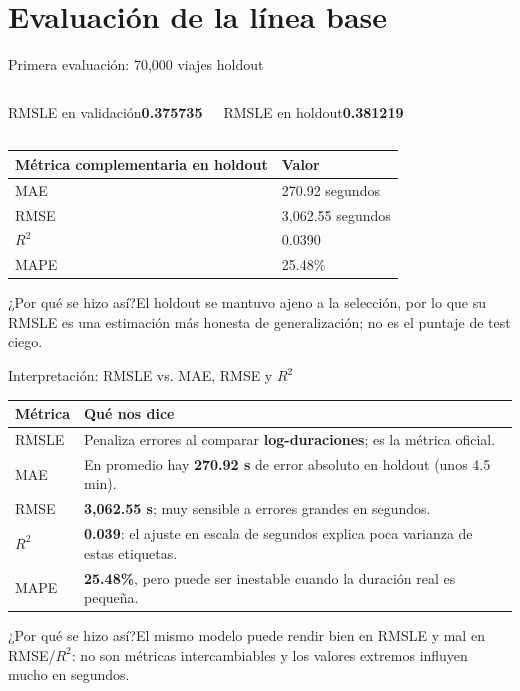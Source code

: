 \documentclass[aspectratio=169,11pt]{beamer}
\newcommand{\porq}[1]{\vspace{1.2mm}\begin{block}{¿Por qué se hizo así?}\small #1\end{block}}
\newcommand{\dato}[2]{\begin{block}{#1}\centering\Large\textbf{#2}\end{block}}
\begin{document}
\section{Evaluación de la línea base}
\begin{frame}{Primera evaluación: 70,000 viajes holdout}
\begin{columns}[T]
\dato{RMSLE en validación}{0.375735}
\dato{RMSLE en holdout}{0.381219}
\end{columns}
\vspace{2mm}
\begin{center}
\small
\begin{tabular}{ll}
\toprule\textbf{Métrica complementaria en holdout} & \textbf{Valor}\\\midrule
MAE & 270.92 segundos\\
RMSE & 3,062.55 segundos\\
$R^2$ & 0.0390\\
MAPE & 25.48\%\\\bottomrule
\end{tabular}
\end{center}
\porq{El holdout se mantuvo ajeno a la selección, por lo que su RMSLE es una estimación más honesta de generalización; no es el puntaje de test ciego.}
\end{frame}

\begin{frame}{Interpretación: RMSLE vs. MAE, RMSE y $R^2$}
\small
\begin{tabular}{p{.19\linewidth}p{.71\linewidth}}
\toprule
\textbf{Métrica} & \textbf{Qué nos dice}\tabularnewline\midrule
RMSLE & Penaliza errores al comparar \textbf{log-duraciones}; es la métrica oficial.\\
MAE & En promedio hay \textbf{270.92 s} de error absoluto en holdout (unos 4.5 min).\\
RMSE & \textbf{3,062.55 s}; muy sensible a errores grandes en segundos.\\
$R^2$ & \textbf{0.039}: el ajuste en escala de segundos explica poca varianza de estas etiquetas.\\
MAPE & \textbf{25.48\%}, pero puede ser inestable cuando la duración real es pequeña.\\
\bottomrule
\end{tabular}
\porq{El mismo modelo puede rendir bien en RMSLE y mal en RMSE/$R^2$: no son métricas intercambiables y los valores extremos influyen mucho en segundos.}
\end{frame}
\end{document}
